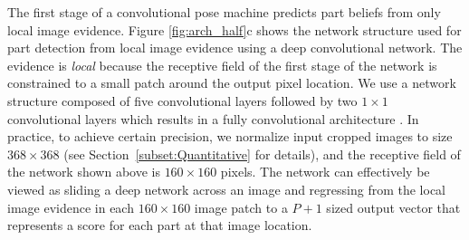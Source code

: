 \documentclass[10pt,twocolumn,letterpaper]{article}
\begin{document}
The first stage of a convolutional pose machine predicts part beliefs from only local image evidence. Figure \ref{fig:arch_half}c shows the network structure used for part detection from local image evidence using a deep convolutional network. The evidence is \emph{local} because the receptive field of the first stage of the network is constrained to a 
small patch around the output pixel location.
We use a network structure composed of five convolutional layers followed by two $1 \times 1$ convolutional layers which results in a fully convolutional architecture \cite{long_shelhamer_fcn}.
In practice, to achieve certain precision, we normalize input cropped images to size $368\times 368$ (see Section~\ref{subset:Quantitative} for details), and the receptive field of the network shown above is $160 \times 160$ pixels. The network can effectively be viewed as sliding a deep network across an image and regressing from the local image evidence in each $160\times 160$ image patch to a $P + 1$ sized output vector that represents a score for each part at that image location.
\end{document}
